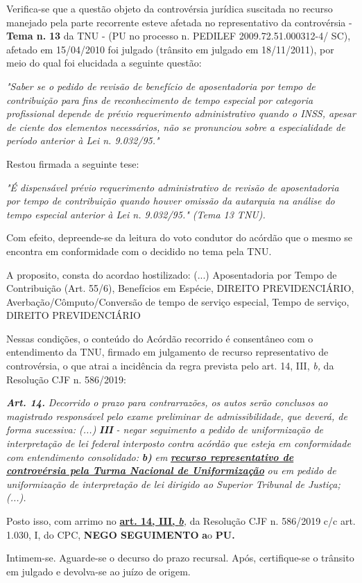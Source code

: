 \documentclass[12pt]{article}
\begin{document}
\justifying
\noindent Verifica-se que a questão objeto da controvérsia jurídica suscitada no recurso manejado pela parte recorrente esteve afetada no representativo da controvérsia - \textbf{Tema n. }\textbf{13} da TNU - (PU no processo n. PEDILEF 2009.72.51.000312-4/ SC),  afetado em 15/04/2010 foi julgado (trânsito em julgado em 18/11/2011), por meio do qual foi elucidada a seguinte questão:

\noindent \textit{"Saber se o pedido de revisão de benefício de aposentadoria por tempo de contribuição para fins de reconhecimento de tempo especial por categoria profissional depende de prévio requerimento administrativo quando o INSS, apesar de ciente dos elementos necessários, não se pronunciou sobre a especialidade de período anterior à Lei n. 9.032/95."}

\noindent Restou firmada a seguinte tese:

\noindent \textit{"É dispensável prévio requerimento administrativo de revisão de aposentadoria por tempo de contribuição quando houver omissão da autarquia na análise do tempo especial anterior à Lei n. 9.032/95." (Tema 13 TNU).}

\noindent Com efeito, depreende-se da leitura do voto condutor do acórdão que o mesmo se encontra em conformidade com o decidido no  tema pela TNU.

\noindent A proposito, consta do acordao hostilizado: (...) Aposentadoria por Tempo de Contribuição (Art. 55/6), Benefícios em Espécie, DIREITO PREVIDENCIÁRIO, Averbação/Cômputo/Conversão de tempo de serviço especial, Tempo de serviço, DIREITO PREVIDENCIÁRIO

\noindent Nessas condições, o conteúdo do Acórdão recorrido é consentâneo com o entendimento da TNU, firmado em julgamento de recurso representativo de controvérsia, o que atrai a incidência da regra prevista pelo art. 14, III, \textit{b,} da Resolução CJF n. 586/2019:

\noindent \textit{\textbf{Art. 14.}}\textit{ Decorrido o prazo para contrarrazões, os autos serão conclusos ao magistrado responsável pelo exame preliminar de admissibilidade, que deverá, de forma sucessiva: (...) }\textit{\textbf{III }}\textit{- negar seguimento a pedido de uniformização de interpretação de lei federal interposto contra acórdão que esteja em conformidade com entendimento consolidado: }\textit{\textbf{b)}}\textit{ em }\uline{\textit{\textbf{recurso representativo de controvérsia pela Turma Nacional de Uniformização}}}\textit{ ou em pedido de uniformização de interpretação de lei dirigido ao Superior Tribunal de Justiça;(...).}

\noindent Posto isso, com arrimo no \uline{\textbf{art. 14, III, }}\uline{\textit{\textbf{b}}}\textit{,} da Resolução CJF n. 586/2019 c/c art. 1.030, I, do CPC, \textbf{NEGO SEGUIMENTO }\textbf{a}o\textbf{ PU}\textbf{.}

\noindent Intimem-se. Aguarde-se o decurso do prazo recursal. Após, certifique-se o trânsito em julgado e devolva-se ao juízo de origem.
\end{document}
